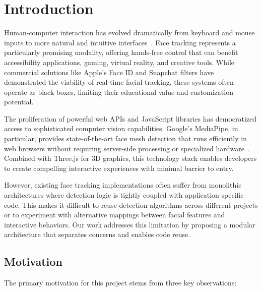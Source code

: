 \documentclass[sigconf]{acmart}
\begin{document}

\maketitle

\section{Introduction}

Human-computer interaction has evolved dramatically from keyboard and mouse inputs to more natural and intuitive interfaces~\cite{card1983psychology}. Face tracking represents a particularly promising modality, offering hands-free control that can benefit accessibility applications, gaming, virtual reality, and creative tools. While commercial solutions like Apple's Face ID and Snapchat filters have demonstrated the viability of real-time facial tracking, these systems often operate as black boxes, limiting their educational value and customization potential.

The proliferation of powerful web APIs and JavaScript libraries has democratized access to sophisticated computer vision capabilities. Google's MediaPipe, in particular, provides state-of-the-art face mesh detection that runs efficiently in web browsers without requiring server-side processing or specialized hardware~\cite{bazarevsky2019blazeface,kartynnik2019real}. Combined with Three.js for 3D graphics, this technology stack enables developers to create compelling interactive experiences with minimal barrier to entry.

However, existing face tracking implementations often suffer from monolithic architectures where detection logic is tightly coupled with application-specific code. This makes it difficult to reuse detection algorithms across different projects or to experiment with alternative mappings between facial features and interactive behaviors. Our work addresses this limitation by proposing a modular architecture that separates concerns and enables code reuse.

\subsection{Motivation}

The primary motivation for this project stems from three key observations:
\end{document}
